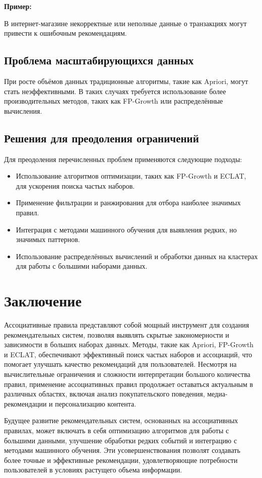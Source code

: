 \textbf{Пример:}

В интернет-магазине некорректные или неполные данные о транзакциях могут привести к ошибочным рекомендациям.

\subsection{Проблема масштабирующихся данных}

При росте объёмов данных традиционные алгоритмы, такие как Apriori, могут стать неэффективными. В таких случаях требуется использование более производительных методов, таких как FP-Growth или распределённые вычисления.

\subsection{Решения для преодоления ограничений}

Для преодоления перечисленных проблем применяются следующие подходы:

\begin{itemize}
    \item Использование алгоритмов оптимизации, таких как FP-Growth и ECLAT, для ускорения поиска частых наборов.
    \item Применение фильтрации и ранжирования для отбора наиболее значимых правил.
    \item Интеграция с методами машинного обучения для выявления редких, но значимых паттернов.
    \item Использование распределённых вычислений и обработки данных на кластерах для работы с большими наборами данных.
\end{itemize}

\section{Заключение}
Ассоциативные правила представляют собой мощный инструмент для создания рекомендательных систем, позволяя выявлять скрытые закономерности и зависимости в больших наборах данных. Методы, такие как Apriori, FP-Growth и ECLAT, обеспечивают эффективный поиск частых наборов и ассоциаций, что помогает улучшать качество рекомендаций для пользователей. Несмотря на вычислительные ограничения и сложности интерпретации большого количества правил, применение ассоциативных правил продолжает оставаться актуальным в различных областях, включая анализ покупательского поведения, медиа-рекомендации и персонализацию контента.

Будущее развитие рекомендательных систем, основанных на ассоциативных правилах, может включать в себя оптимизацию алгоритмов для работы с большими данными, улучшение обработки редких событий и интеграцию с методами машинного обучения. Эти усовершенствования позволят создавать более точные и эффективные рекомендации, удовлетворяющие потребности пользователей в условиях растущего объема информации.

